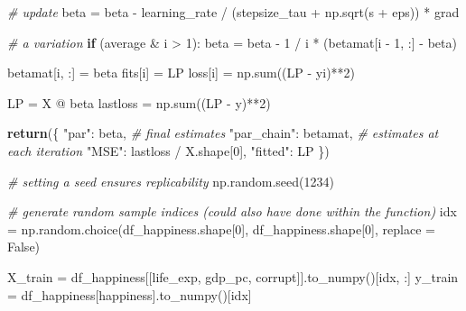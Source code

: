\documentclass[
  letterpaper,
]{krantz}
\newenvironment{Shaded}{}{}
\newcommand{\BuiltInTok}[1]{\textcolor[rgb]{0.00,0.50,0.00}{#1}}
\newcommand{\CommentTok}[1]{\textcolor[rgb]{0.38,0.63,0.69}{\textit{#1}}}
\newcommand{\ControlFlowTok}[1]{\textcolor[rgb]{0.00,0.44,0.13}{\textbf{#1}}}
\newcommand{\DecValTok}[1]{\textcolor[rgb]{0.25,0.63,0.44}{#1}}
\newcommand{\NormalTok}[1]{#1}
\newcommand{\OperatorTok}[1]{\textcolor[rgb]{0.40,0.40,0.40}{#1}}
\newcommand{\StringTok}[1]{\textcolor[rgb]{0.25,0.44,0.63}{#1}}
\newcommand{\VariableTok}[1]{\textcolor[rgb]{0.10,0.09,0.49}{#1}}
\begin{document}
\begin{Shaded}
\begin{Highlighting}[]
        \CommentTok{\# update}
\NormalTok{        beta }\OperatorTok{=}\NormalTok{ beta }\OperatorTok{{-}}\NormalTok{ learning\_rate }\OperatorTok{/}\NormalTok{ (stepsize\_tau }\OperatorTok{+}\NormalTok{ np.sqrt(s }\OperatorTok{+}\NormalTok{ eps)) }\OperatorTok{*}\NormalTok{ grad}

        \CommentTok{\# a variation}
        \ControlFlowTok{if}\NormalTok{ (average }\OperatorTok{\&}\NormalTok{ i }\OperatorTok{\textgreater{}} \DecValTok{1}\NormalTok{):}
\NormalTok{            beta }\OperatorTok{=}\NormalTok{ beta }\OperatorTok{{-}} \DecValTok{1} \OperatorTok{/}\NormalTok{ i }\OperatorTok{*}\NormalTok{ (betamat[i }\OperatorTok{{-}} \DecValTok{1}\NormalTok{, :] }\OperatorTok{{-}}\NormalTok{ beta)}

\NormalTok{        betamat[i, :] }\OperatorTok{=}\NormalTok{ beta}
\NormalTok{        fits[i] }\OperatorTok{=}\NormalTok{ LP}
\NormalTok{        loss[i] }\OperatorTok{=}\NormalTok{ np.}\BuiltInTok{sum}\NormalTok{((LP }\OperatorTok{{-}}\NormalTok{ yi)}\OperatorTok{**}\DecValTok{2}\NormalTok{)}

\NormalTok{    LP }\OperatorTok{=}\NormalTok{ X }\OperatorTok{@}\NormalTok{ beta}
\NormalTok{    lastloss }\OperatorTok{=}\NormalTok{ np.}\BuiltInTok{sum}\NormalTok{((LP }\OperatorTok{{-}}\NormalTok{ y)}\OperatorTok{**}\DecValTok{2}\NormalTok{)}

    \ControlFlowTok{return}\NormalTok{(\{}
        \StringTok{"par"}\NormalTok{: beta, }\CommentTok{\# final estimates}
        \StringTok{"par\_chain"}\NormalTok{: betamat, }\CommentTok{\# estimates at each iteration}
        \StringTok{"MSE"}\NormalTok{: lastloss }\OperatorTok{/}\NormalTok{ X.shape[}\DecValTok{0}\NormalTok{],}
        \StringTok{"fitted"}\NormalTok{: LP}
\NormalTok{    \})}

\CommentTok{\# setting a seed ensures replicability}
\NormalTok{np.random.seed(}\DecValTok{1234}\NormalTok{)}

\CommentTok{\# generate random sample indices (could also have done within the function)}
\NormalTok{idx }\OperatorTok{=}\NormalTok{ np.random.choice(df\_happiness.shape[}\DecValTok{0}\NormalTok{], df\_happiness.shape[}\DecValTok{0}\NormalTok{], replace }\OperatorTok{=} \VariableTok{False}\NormalTok{)}

\NormalTok{X\_train }\OperatorTok{=}\NormalTok{ df\_happiness[[}\StringTok{\textquotesingle{}life\_exp\textquotesingle{}}\NormalTok{, }\StringTok{\textquotesingle{}gdp\_pc\textquotesingle{}}\NormalTok{, }\StringTok{\textquotesingle{}corrupt\textquotesingle{}}\NormalTok{]].to\_numpy()[idx, :]}
\NormalTok{y\_train }\OperatorTok{=}\NormalTok{ df\_happiness[}\StringTok{\textquotesingle{}happiness\textquotesingle{}}\NormalTok{].to\_numpy()[idx]}


\end{Highlighting}
\end{Shaded}
\end{document}
